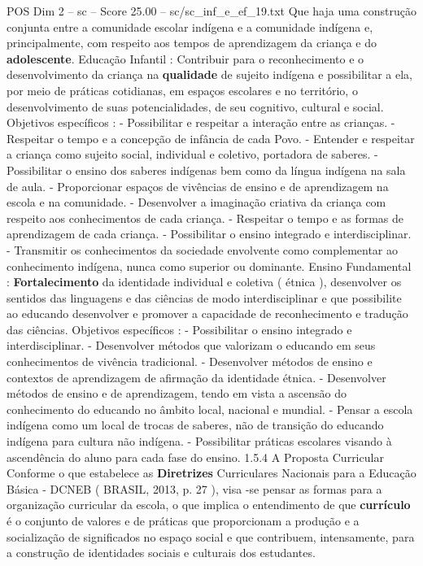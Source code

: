 \begin{textsample}{POS Dim 2 – sc – Score 25.00 – sc/sc\_inf\_e\_ef\_19.txt}
Que haja uma construção conjunta entre a comunidade escolar indígena e a comunidade indígena e, principalmente, com respeito aos tempos de aprendizagem da criança e do \textbf{adolescente}.
Educação Infantil : Contribuir para o reconhecimento e o desenvolvimento da criança na \textbf{qualidade} de sujeito indígena e possibilitar a ela, por meio de práticas cotidianas, em espaços escolares e no território, o desenvolvimento de suas potencialidades, de seu cognitivo, cultural e social.
Objetivos específicos : - Possibilitar e respeitar a interação entre as crianças. - Respeitar o tempo e a concepção de infância de cada Povo. - Entender e respeitar a criança como sujeito social, individual e coletivo, portadora de saberes. - Possibilitar o ensino dos saberes indígenas bem como da língua indígena na sala de aula. - Proporcionar espaços de vivências de ensino e de aprendizagem na escola e na comunidade. - Desenvolver a imaginação criativa da criança com respeito aos conhecimentos de cada criança. - Respeitar o tempo e as formas de aprendizagem de cada criança. - Possibilitar o ensino integrado e interdisciplinar. - Transmitir os conhecimentos da sociedade envolvente como complementar ao conhecimento indígena, nunca como superior ou dominante.
Ensino Fundamental : \textbf{Fortalecimento} da identidade individual e coletiva ( étnica ), desenvolver os sentidos das linguagens e das ciências de modo interdisciplinar e que possibilite ao educando desenvolver e promover a capacidade de reconhecimento e tradução das ciências.
Objetivos específicos : - Possibilitar o ensino integrado e interdisciplinar. - Desenvolver métodos que valorizam o educando em seus conhecimentos de vivência tradicional. - Desenvolver métodos de ensino e contextos de aprendizagem de afirmação da identidade étnica. - Desenvolver métodos de ensino e de aprendizagem, tendo em vista a ascensão do conhecimento do educando no âmbito local, nacional e mundial. - Pensar a escola indígena como um local de trocas de saberes, não de transição do educando indígena para cultura não indígena. - Possibilitar práticas escolares visando à ascendência do aluno para cada fase do ensino. 1.5.4 A Proposta Curricular Conforme o que estabelece as \textbf{Diretrizes} Curriculares Nacionais para a Educação Básica - DCNEB ( BRASIL, 2013, p. 27 ), visa -se pensar as formas para a organização curricular da escola, o que implica o entendimento de que \textbf{currículo} é o conjunto de valores e de práticas que proporcionam a produção e a socialização de significados no espaço social e que contribuem, intensamente, para a construção de identidades sociais e culturais dos estudantes.

\end{textsample}
